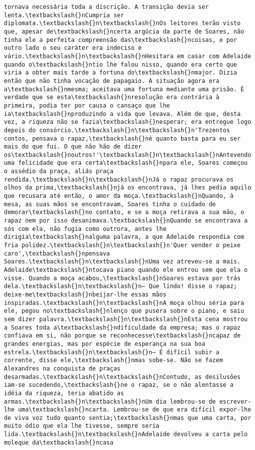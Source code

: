 \begin{Verbatim}[commandchars=\\\{\}]
tornava necessária toda a discrição. A transição devia ser lenta.\textbackslash{}nCumpria ser diplomata.\textbackslash{}n\textbackslash{}nOs leitores terão visto que, apesar de\textbackslash{}ncerta argúcia da parte de Soares, não tinha ele a perfeita compreensão das\textbackslash{}ncoisas, e por outro lado o seu caráter era indeciso e vário.\textbackslash{}n\textbackslash{}nHesitara em casar com Adelaide quando o\textbackslash{}ntio lhe falou nisso, quando era certo que viria a obter mais tarde a fortuna do\textbackslash{}nmajor. Dizia então que não tinha vocação de papagaio. A situação agora era a\textbackslash{}nmesma; aceitava uma fortuna mediante uma prisão. É verdade que se esta\textbackslash{}nresolução era contrária à primeira, podia ter por causa o cansaço que lhe ia\textbackslash{}nproduzindo a vida que levava. Além de que, desta vez, a riqueza não se fazia\textbackslash{}nesperar; era entregue logo depois do consórcio.\textbackslash{}n\textbackslash{}n'Trezentos contos, pensava o rapaz,\textbackslash{}né quanto basta para eu ser mais do que fui. O que não hão de dizer os\textbackslash{}noutros!'\textbackslash{}n\textbackslash{}nAntevendo uma felicidade que era certa\textbackslash{}npara ele, Soares começou o assédio da praça, aliás praça rendida.\textbackslash{}n\textbackslash{}nJá o rapaz procurava os olhos da prima,\textbackslash{}njá os encontrava, já lhes pedia aquilo que recusara até então, o amor da moça.\textbackslash{}nQuando, à mesa, as suas mãos se encontravam, Soares tinha o cuidado de demorar\textbackslash{}no contato, e se a moça retirava a sua mão, o rapaz nem por isso desanimava.\textbackslash{}nQuando se encontrava a sós com ela, não fugia como outrora, antes lhe dirigia\textbackslash{}nalguma palavra, a que Adelaide respondia com fria polidez.\textbackslash{}n\textbackslash{}n'Quer vender o peixe caro',\textbackslash{}npensava Soares.\textbackslash{}n\textbackslash{}nUma vez atreveu-se a mais. Adelaide\textbackslash{}ntocava piano quando ele entrou sem que ela o visse. Quando a moça acabou,\textbackslash{}nSoares estava por trás dela.\textbackslash{}n\textbackslash{}n— Que lindo! disse o rapaz; deixe-me\textbackslash{}nbeijar-lhe essas mãos inspiradas.\textbackslash{}n\textbackslash{}nA moça olhou séria para ele, pegou no\textbackslash{}nlenço que pusera sobre o piano, e saiu sem dizer palavra.\textbackslash{}n\textbackslash{}nEsta cena mostrou a Soares toda a\textbackslash{}ndificuldade da empresa; mas o rapaz confiava em si, não porque se reconhecesse\textbackslash{}ncapaz de grandes energias, mas por espécie de esperança na sua boa estrela.\textbackslash{}n\textbackslash{}n— É difícil subir a corrente, disse ele,\textbackslash{}nmas sobe-se. Não se fazem Alexandres na conquista de praças desarmadas.\textbackslash{}n\textbackslash{}nContudo, as desilusões iam-se sucedendo,\textbackslash{}ne o rapaz, se o não alentasse a idéia da riqueza, teria abatido as armas.\textbackslash{}n\textbackslash{}nUm dia lembrou-se de escrever-lhe uma\textbackslash{}ncarta. Lembrou-se de que era difícil expor-lhe de viva voz tudo quanto sentia;\textbackslash{}nmas que uma carta, por muito ódio que ela lhe tivesse, sempre seria lida.\textbackslash{}n\textbackslash{}nAdelaide devolveu a carta pelo moleque da\textbackslash{}ncasa 
\end{Verbatim}
